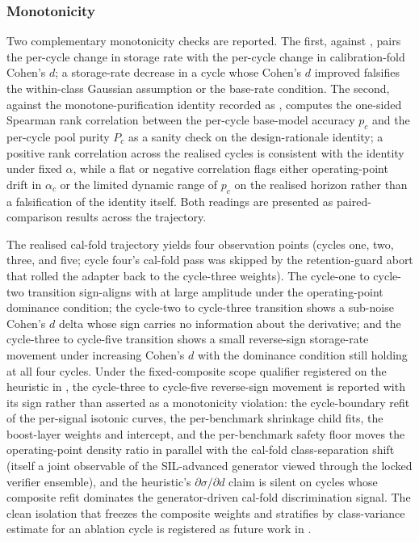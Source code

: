 



\subsubsection{Monotonicity}
\label{sec:check-monotonicity}

Two complementary monotonicity checks are reported. The first, against , pairs the per-cycle change in storage rate with the per-cycle change in calibration-fold Cohen's $d$; a storage-rate decrease in a cycle whose Cohen's $d$ improved falsifies the within-class Gaussian assumption or the base-rate condition. The second, against the monotone-purification identity recorded as , computes the one-sided Spearman rank correlation between the per-cycle base-model accuracy $p_c$ and the per-cycle pool purity $P_c$ as a sanity check on the design-rationale identity; a positive rank correlation across the realised cycles is consistent with the identity under fixed $\alpha$, while a flat or negative correlation flags either operating-point drift in $\alpha_c$ or the limited dynamic range of $p_c$ on the realised horizon rather than a falsification of the identity itself. Both readings are presented as paired-comparison results across the trajectory.

The realised cal-fold trajectory yields four observation points (cycles one, two, three, and five; cycle four's cal-fold pass was skipped by the retention-guard abort that rolled the adapter back to the cycle-three weights). The cycle-one to cycle-two transition sign-aligns with  at large amplitude under the operating-point dominance condition; the cycle-two to cycle-three transition shows a sub-noise Cohen's $d$ delta whose sign carries no information about the derivative; and the cycle-three to cycle-five transition shows a small reverse-sign storage-rate movement under increasing Cohen's $d$ with the dominance condition still holding at all four cycles. Under the fixed-composite scope qualifier registered on the heuristic in , the cycle-three to cycle-five reverse-sign movement is reported with its sign rather than asserted as a monotonicity violation: the cycle-boundary refit of the per-signal isotonic curves, the per-benchmark shrinkage child fits, the boost-layer weights and intercept, and the per-benchmark safety floor moves the operating-point density ratio in parallel with the cal-fold class-separation shift (itself a joint observable of the SIL-advanced generator viewed through the locked verifier ensemble), and the heuristic's $\partial \sigma / \partial d$ claim is silent on cycles whose composite refit dominates the generator-driven cal-fold discrimination signal. The clean isolation that freezes the composite weights and stratifies by class-variance estimate for an ablation cycle is registered as future work in .

